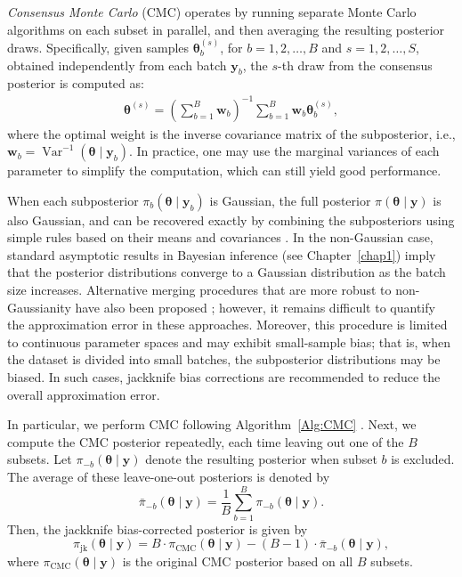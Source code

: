 \textit{Consensus Monte Carlo} (CMC) operates by running separate Monte Carlo algorithms on each subset in parallel, and then averaging the resulting posterior draws. Specifically, given samples \( \boldsymbol{\theta}_b^{(s)} \), for  \( b = 1, 2, \dots, B \) and \( s = 1, 2, \dots, S \), obtained independently from each batch \( \mathbf{y}_b \), the \( s \)-th draw from the consensus posterior is computed as:
\begin{align*}
	\boldsymbol{\theta}^{(s)} = \left( \sum_{b=1}^B \mathbf{w}_b \right)^{-1} \sum_{b=1}^B \mathbf{w}_b \boldsymbol{\theta}_b^{(s)},
\end{align*}
where the optimal weight is the inverse covariance matrix of the subposterior, i.e., \( \mathbf{w}_b = \operatorname{Var}^{-1}(\boldsymbol{\theta} \mid \mathbf{y}_b) \). In practice, one may use the marginal variances of each parameter to simplify the computation, which can still yield good performance.

When each subposterior \( \pi_b(\boldsymbol{\theta} \mid \mathbf{y}_b) \) is Gaussian, the full posterior \( \pi(\boldsymbol{\theta} \mid \mathbf{y}) \) is also Gaussian, and can be recovered exactly by combining the subposteriors using simple rules based on their means and covariances \cite{scott2016bayes, scott2022bayes}. In the non-Gaussian case, standard asymptotic results in Bayesian inference (see Chapter~\ref{chap1}) imply that the posterior distributions converge to a Gaussian distribution as the batch size increases. Alternative merging procedures that are more robust to non-Gaussianity have also been proposed \cite{neiswanger2013asymptotically, minsker2017robust}; however, it remains difficult to quantify the approximation error in these approaches. Moreover, this procedure is limited to continuous parameter spaces and may exhibit small-sample bias; that is, when the dataset is divided into small batches, the subposterior distributions may be biased. In such cases, jackknife bias corrections are recommended to reduce the overall approximation error.

In particular, we perform CMC following Algorithm~\ref{Alg:CMC} \cite{scott2016bayes}. Next, we compute the CMC posterior repeatedly, each time leaving out one of the \( B \) subsets. Let \( \pi_{-b}(\boldsymbol{\theta} \mid \mathbf{y}) \) denote the resulting posterior when subset \( b \) is excluded. The average of these leave-one-out posteriors is denoted by
\[
\bar{\pi}_{-b}(\boldsymbol{\theta} \mid \mathbf{y}) = \frac{1}{B} \sum_{b=1}^B \pi_{-b}(\boldsymbol{\theta} \mid \mathbf{y}).
\]
Then, the jackknife bias-corrected posterior is given by
\[
\pi_{\text{jk}}(\boldsymbol{\theta} \mid \mathbf{y}) = B \cdot \pi_{\text{CMC}}(\boldsymbol{\theta} \mid \mathbf{y}) - (B - 1) \cdot \bar{\pi}_{-b}(\boldsymbol{\theta} \mid \mathbf{y}),
\]
where \( \pi_{\text{CMC}}(\boldsymbol{\theta} \mid \mathbf{y}) \) is the original CMC posterior based on all \( B \) subsets.

